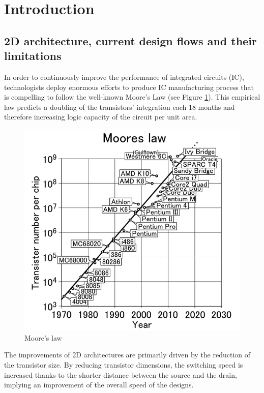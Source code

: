 \chapter*{Introduction}
\fancyhead[LO]{} 

\section*{2D architecture, current design flows and their limitations}
In order to continuously improve the performance of integrated circuits (IC), technologists deploy enormous efforts to produce IC manufacturing process that is compelling to follow the well-known Moore's Law (see Figure \ref{fig:mooreslaw}). This empirical law predicts a doubling of the transistors' integration each 18 months and therefore increasing logic capacity of the circuit per unit area. 

\begin{figure}
\begin{center}
\includegraphics[width=0.7\linewidth]{mooreslaw.png}
\end{center}
\vspace{-0.5cm}
\caption{Moore's law \cite{mooreslawpic}}
\label{fig:mooreslaw}
\end{figure}

The improvements of 2D architectures are primarily driven by the reduction of the transistor size. By reducing transistor dimensions, the switching speed is increased thanks to the shorter distance between the source and the drain, implying an improvement of the overall speed of the designs.

